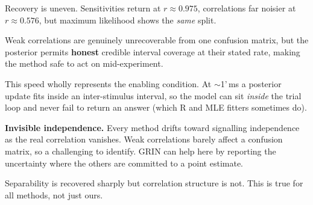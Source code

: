 \documentclass[final]{article}
\newlength{\colw}
\begin{document}
\hfill
\begin{minipage}[t]{\colw}


{\bodyfont
Recovery is uneven. Sensitivities return at $r \approx 0.975$, correlations far noisier at
$r \approx 0.576$, but maximum likelihood shows the \emph{same} split.%
\par\medskip\medskip}

{\bodyfont
Weak correlations are genuinely unrecoverable from one confusion matrix, but the posterior permits \textbf{honest} credible interval coverage at their stated rate, making the method safe to act on mid-experiment.
\par}

\end{minipage}%
\hfill
\begin{minipage}[t]{\colw}



{\bodyfont\medskip
This speed wholly represents the enabling condition.
At $\sim$1'\,ms a posterior update fits inside an inter-stimulus interval, so the model can sit \emph{inside} the trial loop and never fail to return an answer (which R and MLE fitters sometimes do).
\par}
\end{minipage}%
\hfill
\begin{minipage}[t]{\colw}

\begin{callout}
\textbf{Invisible independence.} Every method drifts toward signalling independence as the real
correlation vanishes. Weak correlations barely affect a confusion matrix, so a challenging to identify.
GRIN can help here by reporting the uncertainty where  the others are committed to a point estimate.
\end{callout}

{\bodyfont
Separability is recovered sharply but correlation structure is not. This is true for all methods, not just ours.\par}
\end{minipage}%
\end{document}
